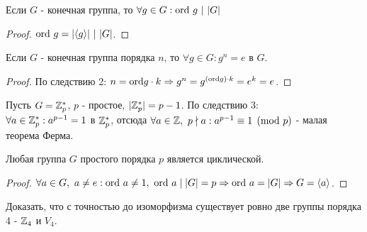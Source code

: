 \begin{consequensenum}
    Если $G$ - конечная группа, то $\forall g\in G: \textup{ord }g\ |\ |G|$
\end{consequensenum}
\begin{proof}
    $\textup{ord } g =|\langle g \rangle|\ |\ |G|$.
\end{proof}
\begin{consequensenum}
    Если $G$ - конечная группа порядка $n$, то $\forall g\in G: g^n=e$ в $G$.
\end{consequensenum}
\begin{proof}
    По следствию 2: $n=\textup{ord}g\cdot k \Rightarrow g^n=g^{(\textup{ord} g)\cdot k} = e^k = e$.
\end{proof}
\begin{example}
    Пусть $G=\mathbb{Z}_p^*$, $p$ - простое, $|\mathbb{Z}_p^*| = p-1$. По следствию 3:\\
    $\forall a\in \mathbb{Z}_p^*: a^{p-1}=1$ в $\mathbb{Z}_p^*$, отсюда $\forall a\in \mathbb{Z},\ p \nmid a: a^{p-1}\equiv 1\pmod{p}$ - малая теорема Ферма.
\end{example}
\begin{consequensenum}
    Любая группа $G$ простого порядка $p$ является циклической.
\end{consequensenum}
\begin{proof}
    $\forall a\in G,\ a \neq e: \textup{ord }a \neq 1,\ \textup{ord }a \mid |G|=p \Rightarrow \textup{ord }a = |G| \Rightarrow G=\langle a \rangle$.
\end{proof}
\begin{exercise}
    Доказать, что с точностью до изоморфизма существует ровно две группы порядка 4 - $\mathbb{Z}_4$ и $V_4$.
\end{exercise}
